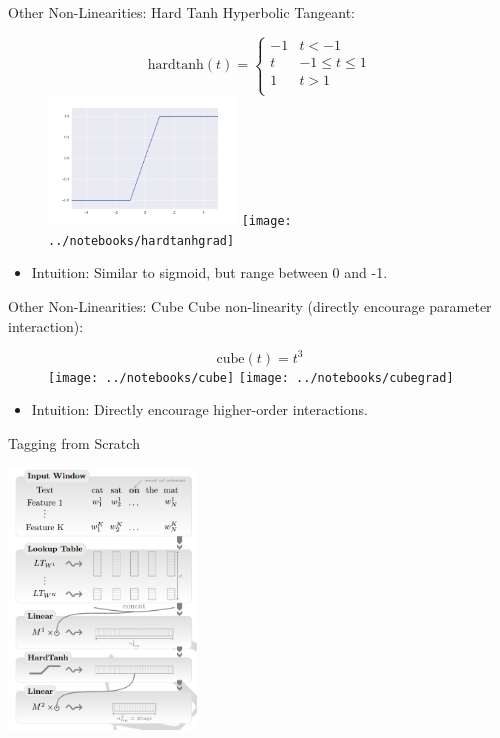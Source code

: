\documentclass{beamer}
\begin{document}
\begin{frame}{Other Non-Linearities: Hard Tanh}
  Hyperbolic Tangeant:
  \begin{figure}
    \centering
    \[\mathrm{hardtanh}(t) =
      \begin{cases}
        -1& t < -1 \\
        t & -1
\leq t \leq 1\\
        1 & t > 1\\
      \end{cases}
    \]
    \includegraphics[width=5cm]{../notebooks/hardtanh}
    \texttt{[image: ../notebooks/hardtanhgrad]}
  \end{figure}
  \begin{itemize}
  \item Intuition: Similar to sigmoid, but range between 0 and -1.
  \end{itemize}
\end{frame}


\begin{frame}{Other Non-Linearities: Cube}
  Cube non-linearity (directly encourage parameter interaction):
  \begin{figure}
    \centering
    \[\mathrm{cube}(t) = t^3  \]
    \texttt{[image: ../notebooks/cube]}
    \texttt{[image: ../notebooks/cubegrad]}
  \end{figure}
  \begin{itemize}
  \item Intuition: Directly encourage higher-order interactions.
  \end{itemize}
\end{frame}


\begin{frame}{Tagging from Scratch}
  \begin{center}
    \includegraphics[width=5cm]{cwfull}
  \end{center}
\end{frame}
\end{document}
